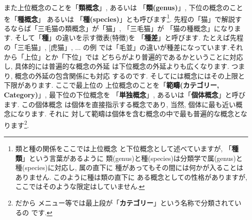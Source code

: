 \documentclass[b5j,8pt,twocolumn]{ltjsarticle}
\begin{document}
また上位概念のことを「\textbf{類概念}」, あるいは
「\textbf{類(genus)}」, 下位の概念のことを「\textbf{種概念}」 あるいは
「\textbf{種(species)}」とも呼びます\footnote{類と種の関係をここでは上位概念
と下位概念として述べていますが, 「\textbf{種類}」という言葉があるように
類(genus)と種(species)は分類学で属(genus)と種(species)に対応し, 属の直下に
種があってもその間には何かが入ることはありません. このように種は類の直下に
ある概念としての性格がありますが, ここではそのような限定はしていません.}.
 先程の「猫」で解説するならば「三毛猫の類概念」が「猫」, 「三毛猫」が
「猫の種概念」になります. そして「\textbf{種}」の違いを示す徴表(特徴)を
「\textbf{種差}」と呼びます. たとえば先程の「三毛猫」, [虎猫」, ... の例
では「毛並」の違いが種差になっています.それから「上位」とか「下位」では
どちらがより普遍的であるかということに対応し, 具体的には普遍的な概念の外延
は下位概念の外延よりも広くなります. つまり, 概念の外延の包含関係にも対応
するのです. そしてには概念にはその上限と下限があります. ここで最上位の
上位概念のことを「\textbf{範疇(カテゴリー, Category)}」, 最下位の下位概念を
「\textbf{単独概念}」, あるいは「\textbf{個体概念}」と呼びます. この個体概念
は個体を直接指示する概念であり, 当然, 個体に最も近い概念になります. それに
対して範疇は個体を含む概念の中で最も普遍的な概念となります\footnote{だから
メニュー等では最上段が「\textbf{カテゴリー}」という名称で分類されているの
です.}.
\newline
\end{document}
